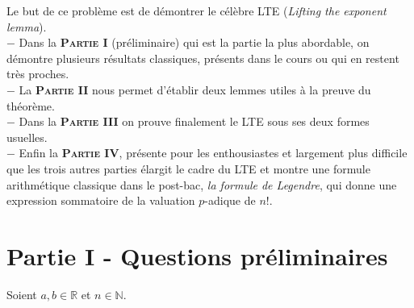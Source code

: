 \documentclass{article}
\newcommand{\R}{\mathbb{R}}
\newcommand{\N}{\mathbb{N}}
\begin{document}
\vspace{0.8 cm}

\noindent Le but de ce problème est de démontrer le célèbre \textsc{LTE} (\textit{Lifting the exponent lemma}). \\
$-$ Dans la \textbf{\textsc{Partie I}} (préliminaire) qui est la partie la plus abordable, on démontre plusieurs résultats classiques, présents dans le cours ou qui en restent très proches. 
\\ $-$ La \textbf{\textsc{Partie II}} nous permet d'établir deux lemmes utiles à la preuve du théorème. \\
$-$ Dans la \textbf{\textsc{Partie III}} on prouve finalement le \textsc{LTE} sous ses deux formes usuelles. \\
$-$ Enfin la \textbf{\textsc{Partie IV}}, présente pour les enthousiastes et largement plus difficile que les trois autres parties élargit le cadre du \textsc{LTE} et montre une formule arithmétique classique dans le post-bac, \textit{la formule de Legendre}, qui donne une expression sommatoire de la valuation $p$-adique de $n!$.

\newpage


\section*{Partie I - Questions préliminaires}

\vspace{0.3 cm}

\noindent Soient $a,b \in \R$ et $n \in \N$.
\end{document}
